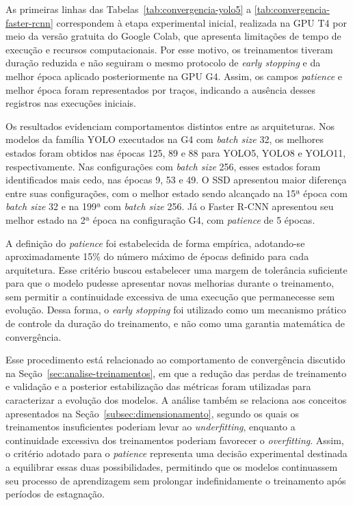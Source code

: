 As primeiras linhas das Tabelas~\ref{tab:convergencia-yolo5} a
\ref{tab:convergencia-faster-rcnn} correspondem à etapa experimental inicial, realizada na GPU T4
por meio da versão gratuita do Google Colab, que apresenta limitações de tempo de execução e
recursos computacionais. Por esse motivo, os treinamentos tiveram duração reduzida e não seguiram o
mesmo protocolo de \textit{early stopping} e da melhor época aplicado posteriormente na GPU
G4. Assim, os campos \textit{patience} e melhor época foram representados por traços, indicando a
ausência desses registros nas execuções iniciais.

Os resultados evidenciam comportamentos distintos entre as arquiteturas. Nos modelos da família
YOLO executados na G4 com \textit{batch size} 32, os melhores estados foram obtidos nas épocas
125, 89 e 88 para YOLO5, YOLO8 e YOLO11, respectivamente. Nas configurações com
\textit{batch size} 256, esses estados foram identificados mais cedo, nas épocas 9, 53 e 49.
O SSD apresentou maior diferença entre suas configurações, com o melhor estado sendo alcançado
na 15ª época com \textit{batch size} 32 e na 199ª com \textit{batch size} 256. Já o Faster
R-CNN apresentou seu melhor estado na 2ª época na configuração G4, com \textit{patience} de
5 épocas.

A definição do \textit{patience} foi estabelecida de forma empírica, adotando-se aproximadamente
15\% do número máximo de épocas definido para cada arquitetura. Esse critério buscou estabelecer
uma margem de tolerância suficiente para que o modelo pudesse apresentar novas melhorias durante
o treinamento, sem permitir a continuidade excessiva de uma execução que permanecesse sem
evolução. Dessa forma, o \textit{early stopping} foi utilizado como um mecanismo prático de
controle da duração do treinamento, e não como uma garantia matemática de convergência.

Esse procedimento está relacionado ao comportamento de convergência discutido na
Seção~\ref{sec:analise-treinamentos}, em que a redução das perdas de treinamento e validação
e a posterior estabilização das métricas foram utilizadas para caracterizar a evolução dos
modelos. A análise também se relaciona aos conceitos apresentados na
Seção~\ref{subsec:dimensionamento}, segundo os quais os treinamentos insuficientes poderiam levar ao
\textit{underfitting}, enquanto a continuidade excessiva dos treinamentos poderiam favorecer o
\textit{overfitting}. Assim, o critério adotado para o \textit{patience} representa uma
decisão experimental destinada a equilibrar essas duas possibilidades, permitindo que os modelos
continuassem seu processo de aprendizagem sem prolongar indefinidamente o treinamento após
períodos de estagnação.

